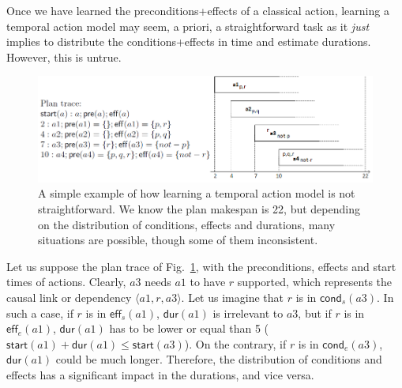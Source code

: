 \documentclass[runningheads]{llncs}
\newcommand{\tup}[1]{{\langle #1 \rangle}}
\newcommand{\pre}{\mathsf{pre}}    %
\newcommand{\eff}{\mathsf{eff}}    %
\newcommand{\cond}{\mathsf{cond}}  %
\newcommand{\dur}{\mathsf{dur}}    %
\newcommand{\start}{\mathsf{start}}%
\begin{document}
Once we have learned the preconditions+effects of a classical action, learning a temporal action model may seem, a priori, a straightforward task as it \emph{just} implies to distribute the conditions+effects in time and estimate durations. However, this is untrue.

\begin{figure}


\center \includegraphics[width=12cm]{ejemploacciones2.png}
\caption{A simple example of how learning a temporal action model is not straightforward. We know the plan makespan is 22, but depending on the distribution of conditions, effects and durations, many situations are possible, though some of them inconsistent.}
\label{fig:exampleplantrace}
\end{figure}


Let us suppose the plan trace of Fig.~\ref{fig:exampleplantrace}, with the preconditions, effects and start times of actions. Clearly, $a3$ needs $a1$ to have $r$ supported, which represents the causal link or dependency $\tup{a1,r,a3}$. Let us imagine that $r$ is in $\cond_s(a3)$. In such a case, if $r$ is in $\eff_s(a1)$, $\dur(a1)$ is irrelevant to $a3$, but if $r$ is in $\eff_e(a1)$, $\dur(a1)$ has to be lower or equal than 5 ($\start(a1)+\dur(a1) \leq \start(a3)$). On the contrary, if $r$ is in $\cond_e(a3)$, $\dur(a1)$ could be much longer. Therefore, the distribution of conditions and effects has a significant impact in the durations, and vice versa.
\end{document}
